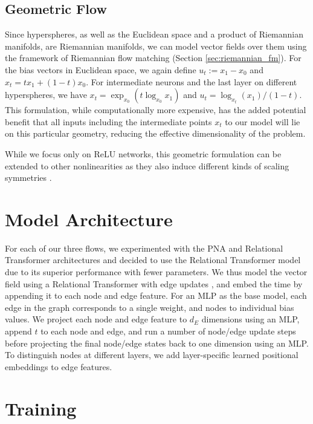 \subsection{Geometric Flow}

Since hyperspheres, as well as the Euclidean space and a product of Riemannian manifolds, are Riemannian manifolds, we can model vector fields over them using the framework of Riemannian flow matching \citep{chenRiemannianFlowMatching2023} (Section \ref{sec:riemannian_fm}). For the bias vectors in Euclidean space, we again define $u_t := x_1 - x_0$ and $x_t = t x_1 + (1-t) x_0$. For intermediate neurons and the last layer on different hyperspheres, we have $x_t = \exp_{x_0}(t \log_{x_0}x_1)$ and $u_t = \log_{x_t}(x_1) / (1-t)$. This formulation, while computationally more expensive, has the added potential benefit that all inputs including the intermediate points $x_t$ to our model will lie on this particular geometry, reducing the effective dimensionality of the problem. 

While we focus only on ReLU networks, this geometric formulation can be extended to other nonlinearities as they also induce different kinds of scaling symmetries \citep{godfreySymmetriesDeepLearning2022}. 

\section{Model Architecture}

For each of our three flows, we experimented with the PNA and Relational Transformer architectures and decided to use the Relational Transformer model due to its superior performance with fewer parameters. We thus model the vector field using a Relational Transformer with edge updates \citep{diaoRelationalAttentionGeneralizing2023,kofinasGraphNeuralNetworks2024}, and embed the time by appending it to each node and edge feature. For an MLP as the base model, each edge in the graph corresponds to a single weight, and nodes to individual bias values. We project each node and edge feature to $d_E$ dimensions using an MLP, append $t$ to each node and edge, and run a number of node/edge update steps before projecting the final node/edge states back to one dimension using an MLP. To distinguish nodes at different layers, we add layer-specific learned positional embeddings to edge features. 

\section{Training}

